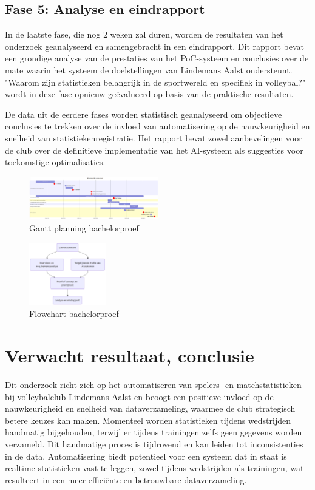 \subsection{Fase 5: Analyse en eindrapport}
In de laatste fase, die nog 2 weken zal duren, worden de resultaten van het onderzoek geanalyseerd en samengebracht in een eindrapport. Dit rapport bevat een grondige analyse van de prestaties van het PoC-systeem en conclusies over de mate waarin het systeem de doelstellingen van Lindemans Aalst ondersteunt. "Waarom zijn statistieken belangrijk in de sportwereld en specifiek in volleybal?" wordt in deze fase opnieuw geëvalueerd op basis van de praktische resultaten.

De data uit de eerdere fases worden statistisch geanalyseerd om objectieve conclusies te trekken over de invloed van automatisering op de nauwkeurigheid en snelheid van statistiekenregistratie. Het rapport bevat zowel aanbevelingen voor de club over de definitieve implementatie van het AI-systeem als suggesties voor toekomstige optimalisaties.

\begin{figure}[ht]
  \centering
  \includegraphics[width=0.5\textwidth]{img/gantt.png}
  \caption{\label{fig:gantt}Gantt planning bachelorproef}
\end{figure}

\begin{figure}[ht]
  \centering
  \includegraphics[width=0.3\textwidth]{img/flowchart.png}
  \caption{\label{fig:flowchart}Flowchart bachelorproef}
\end{figure}

\section{Verwacht resultaat, conclusie}%
\label{sec:verwachte_resultaten}
Dit onderzoek richt zich op het automatiseren van spelers- en matchstatistieken bij volleybalclub Lindemans Aalst en beoogt een positieve invloed op de nauwkeurigheid en snelheid van dataverzameling, waarmee de club strategisch betere keuzes kan maken. Momenteel worden statistieken tijdens wedstrijden handmatig bijgehouden, terwijl er tijdens trainingen zelfs geen gegevens worden verzameld. Dit handmatige proces is tijdrovend en kan leiden tot inconsistenties in de data. Automatisering biedt potentieel voor een systeem dat in staat is realtime statistieken vast te leggen, zowel tijdens wedstrijden als trainingen, wat resulteert in een meer efficiënte en betrouwbare dataverzameling.

